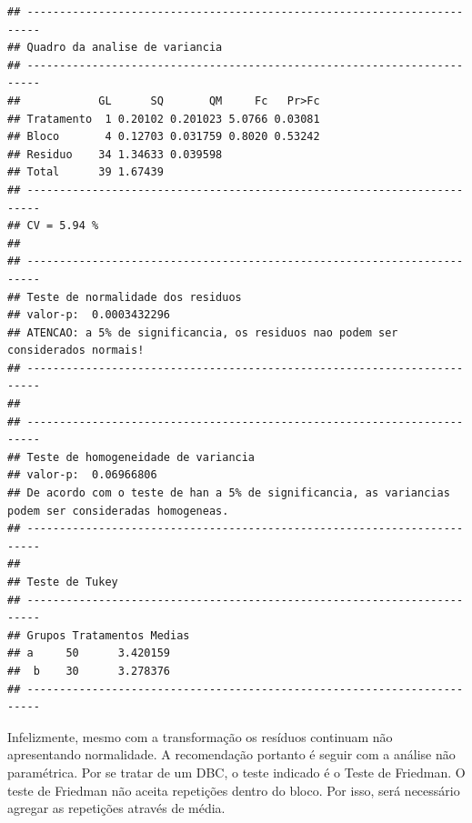 \documentclass[
]{article}
\newenvironment{Shaded}{\begin{snugshade}}{\end{snugshade}}
\newcommand{\DataTypeTok}[1]{\textcolor[rgb]{0.13,0.29,0.53}{#1}}
\newcommand{\KeywordTok}[1]{\textcolor[rgb]{0.13,0.29,0.53}{\textbf{#1}}}
\newcommand{\NormalTok}[1]{#1}
\newcommand{\OperatorTok}[1]{\textcolor[rgb]{0.81,0.36,0.00}{\textbf{#1}}}
\newcommand{\StringTok}[1]{\textcolor[rgb]{0.31,0.60,0.02}{#1}}
\begin{document}
\begin{verbatim}
## ------------------------------------------------------------------------
## Quadro da analise de variancia
## ------------------------------------------------------------------------
##            GL      SQ       QM     Fc   Pr>Fc
## Tratamento  1 0.20102 0.201023 5.0766 0.03081
## Bloco       4 0.12703 0.031759 0.8020 0.53242
## Residuo    34 1.34633 0.039598               
## Total      39 1.67439                        
## ------------------------------------------------------------------------
## CV = 5.94 %
## 
## ------------------------------------------------------------------------
## Teste de normalidade dos residuos 
## valor-p:  0.0003432296 
## ATENCAO: a 5% de significancia, os residuos nao podem ser considerados normais!
## ------------------------------------------------------------------------
## 
## ------------------------------------------------------------------------
## Teste de homogeneidade de variancia 
## valor-p:  0.06966806 
## De acordo com o teste de han a 5% de significancia, as variancias podem ser consideradas homogeneas.
## ------------------------------------------------------------------------
## 
## Teste de Tukey
## ------------------------------------------------------------------------
## Grupos Tratamentos Medias
## a     50      3.420159 
##  b    30      3.278376 
## ------------------------------------------------------------------------
\end{verbatim}

Infelizmente, mesmo com a transformação os resíduos continuam não apresentando normalidade. A recomendação portanto é seguir com a análise não paramétrica. Por se tratar de um DBC, o teste indicado é o Teste de Friedman. O teste de Friedman não aceita repetições dentro do bloco. Por isso, será necessário agregar as repetições através de média.

\begin{Shaded}
\end{Shaded}
\end{document}
